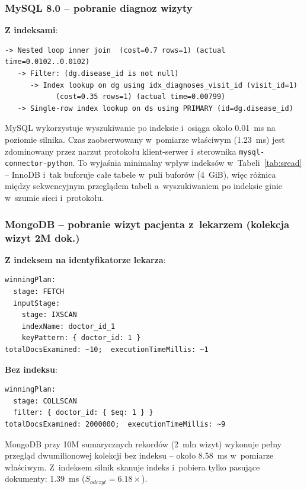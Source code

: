 \documentclass[12pt,a4paper]{article}
\begin{document}
\subsubsection{MySQL 8.0 -- pobranie diagnoz wizyty}

\textbf{Z indeksami}:
\begin{lstlisting}[basicstyle=\ttfamily\scriptsize]
-> Nested loop inner join  (cost=0.7 rows=1) (actual time=0.0102..0.0102)
   -> Filter: (dg.disease_id is not null)
      -> Index lookup on dg using idx_diagnoses_visit_id (visit_id=1)
            (cost=0.35 rows=1) (actual time=0.00799)
   -> Single-row index lookup on ds using PRIMARY (id=dg.disease_id)
\end{lstlisting}

MySQL wykorzystuje wyszukiwanie po indeksie i~osiąga około 0.01~ms na poziomie silnika. Czas zaobserwowany w~pomiarze właściwym (1.23~ms) jest zdominowany przez narzut protokołu klient-serwer i~sterownika \texttt{mysql-connector-python}. To wyjaśnia minimalny wpływ indeksów w~Tabeli~\ref{tab:sread} -- InnoDB i~tak buforuje całe tabele w~puli buforów (4~GiB), więc różnica między sekwencyjnym przeglądem tabeli a~wyszukiwaniem po indeksie ginie w~szumie sieci i~protokołu.

\subsubsection{MongoDB -- pobranie wizyt pacjenta z~lekarzem (kolekcja wizyt 2M dok.)}

\textbf{Z indeksem na identyfikatorze lekarza}:
\begin{lstlisting}[basicstyle=\ttfamily\scriptsize]
winningPlan:
  stage: FETCH
  inputStage:
    stage: IXSCAN
    indexName: doctor_id_1
    keyPattern: { doctor_id: 1 }
totalDocsExamined: ~10;  executionTimeMillis: ~1
\end{lstlisting}

\textbf{Bez indeksu}:
\begin{lstlisting}[basicstyle=\ttfamily\scriptsize]
winningPlan:
  stage: COLLSCAN
  filter: { doctor_id: { $eq: 1 } }
totalDocsExamined: 2000000;  executionTimeMillis: ~9
\end{lstlisting}

MongoDB przy 10M sumarycznych rekordów (2~mln wizyt) wykonuje pełny przegląd dwumilionowej kolekcji bez indeksu -- około 8.58~ms w~pomiarze właściwym. Z~indeksem silnik skanuje indeks i~pobiera tylko pasujące dokumenty: 1.39~ms ($S_{odczyt}=6.18\times$).
\end{document}

